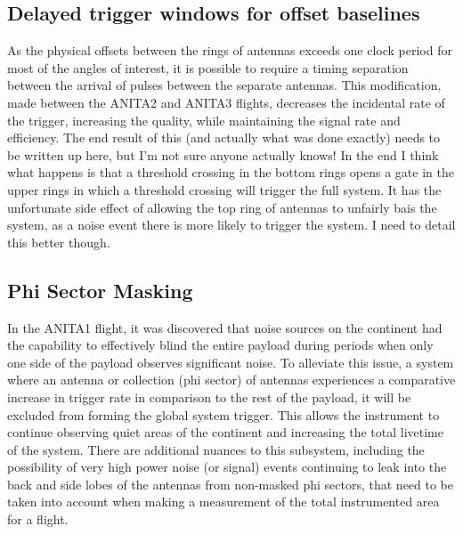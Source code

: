 	\subsection{Delayed trigger windows for offset baselines}
		As the physical offsets between the rings of antennas exceeds one clock period for most of the angles of interest, it is possible to require a timing separation between the arrival of pulses between the separate antennas.  This modification, made between the ANITA2 and ANITA3 flights, decreases the incidental rate of the trigger, increasing the quality, while maintaining the signal rate and efficiency.  The end result of this (and actually what was done exactly) needs to be written up here, but I'm not sure anyone actually knows!  In the end I think what happens is that a threshold crossing in the bottom rings opens a gate in the upper rings in which a threshold crossing will trigger the full system.  It has the unfortunate side effect of allowing the top ring of antennas to unfairly bais the system, as a noise event there is more likely to trigger the system.  I need to detail this better though.
	\subsection{Phi Sector Masking}
		In the ANITA1 flight, it was discovered that noise sources on the continent had the capability to effectively blind the entire payload during periods when only one side of the payload observes significant noise.  To alleviate this issue, a system where an antenna or collection (phi sector) of antennas experiences a comparative increase in trigger rate in comparison to the rest of the payload, it will be excluded from forming the global system trigger.  This allows the instrument to continue observing quiet areas of the continent and increasing the total livetime of the system.  There are additional nuances to this subsystem, including the possibility of very high power noise (or signal) events continuing to leak into the back and side lobes of the antennas from non-masked phi sectors, that need to be taken into account when making a measurement of the total instrumented area for a flight.
		
